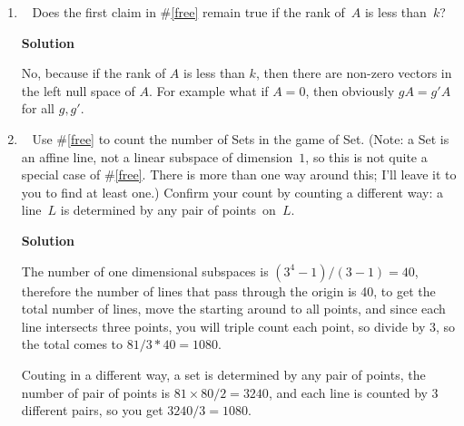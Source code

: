 \documentclass[11pt]{article}
\newcommand\score[1]{\marginpar{\vspace{-2ex}\color{blue}{#1/3}}\hspace{-1ex}}
\newcommand\0{\mathbf{0}}
\newcommand\<{\langle}
\renewcommand\>{\rangle}
\begin{document}
\begin{enumerate}
So the cardinality is $\frac{ \prod_{i=0}^{k-1}(q^n-q^i) }{ \prod_{i=0}^{k-1}(q^k-q^i) }$.

\pagebreak

\item\ \score{3}%
Does the first claim in \#\ref{free} remain true if the rank of~$A$ is
less than~$k$?

\textbf{Solution}

No, because if the rank of $A$ is less than $k$, then there are non-zero vectors in the left null space of $A$.
For example what if $A=0$, then obviously $gA=g'A$ for all $g,g'$.
\pagebreak


\item\ \score{3}%
Use \#\ref{free} to count the number of Sets in the game of Set.
(Note: a Set is an affine line, not a linear subspace of
dimension~$1$, so this is not quite a special case of \#\ref{free}.
There is more than one way around this; I'll leave it to you to find
at least one.)  Confirm your count by counting a different way: a
line~$L$ is determined by any pair of points~on~$L$.

\textbf{Solution}

The number of one dimensional subspaces is $(3^4-1)/(3-1)=40$, therefore the number of lines 
that pass through the origin is 40, to get the total number of lines, move the starting around to all
points, and since each line intersects three points, you will triple count each point, so divide by 3,
so the total comes to $81 / 3 * 40 = 1080$.

Couting in a different way, a set is determined by any pair of points, the number of pair of points
is $81 \times 80 /2 = 3240$, and each line is counted by 3 different pairs, so you get $3240/3 = 1080 $.

\end{enumerate}


\end{document}
